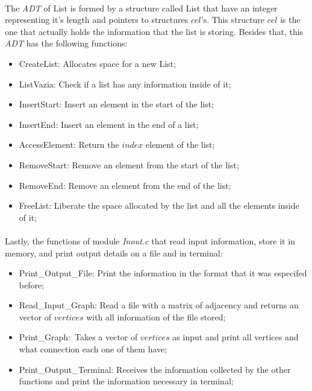 \documentclass[titlepage]{article}
\begin{document}
        \paragraph{}
        The \emph{ADT} of List is formed by a structure called List that have an integer representing it's length and pointers to structures $cel$'s. This structure $cel$ is the one that actually holds the information that the list is storing. Besides that, this \emph{ADT} has the following functions:
        \begin{itemize}
            \item CreateList: Allocates space for a new List;
            \item ListVazia: Check if a list has any information inside of it;
            \item InsertStart: Insert an element in the start of the list;
            \item InsertEnd: Insert an element in the end of a list;
            \item AccessElement: Return the $index$ element of the list;
            \item RemoveStart: Remove an element from the start of the list;
            \item RemoveEnd: Remove an element from the end of the list;
            \item FreeList: Liberate the space allocated by the list and all the elements inside of it; 
        \end{itemize}
        \paragraph{}
        Lastly, the functions of module \emph{Inout.c} that read input information, store it in memory, and print output details on a file and in terminal:
        \begin{itemize}
            \item Print\_Output\_File: Print the information in the format that it was especifed before;
            \item Read\_Input\_Graph: Read a file with a matrix of adjacency and returns an vector of $vertices$ with all information of the file stored;
            \item Print\_Graph:\ Takes a vector of $vertices$ as input and print all vertices and what connection each one of them have;
            \item Print\_Output\_Terminal: Receives the information collected by the other functions and print the information necessary in terminal;
        \end{itemize}
\end{document}
